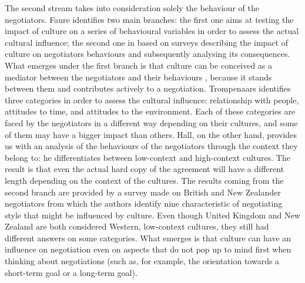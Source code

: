 \documentclass[../main.tex]{subfiles}
\begin{document}
The second stream takes into consideration solely the behaviour of the negotiators. Faure identifies two main branches: the first one aims at testing the impact of culture on a series of behavioural variables in order to assess the actual cultural influence; the second one in based on surveys describing the impact of culture on negotiators behaviours and subsequently analysing its consequences.
What emerges under the first branch is that culture can be conceived as a mediator between the negotiators and their behaviours \mancite\autocite[321]{carnevale}, because it stands between them and contributes actively to a negotiation. Trompenaars identifies three categories in order to assess the cultural influence: relationship with people, attitudes to time, and attitudes to the environment. Each of these categories are faced by the negotiators in a different way depending on their cultures, and some of them may have a bigger impact than others. Hall, on the other hand, provides us with an analysis of the behaviours of the negotiators through the context they belong to: he differentiates between low-context and high-context cultures. The result is that even the actual hard copy of the agreement will have a different length depending on the context of the cultures.
The results coming from the second branch are provided by a survey made on British and New Zealander negotiators from which the authors identify nine characteristic of negotiating style that might be influenced by culture. Even though United Kingdom and New Zealand are both considered Western, low-context cultures, they still had different answers on some categories. What emerges is that culture can have an influence on negotiation even on aspects that do not pop up to mind first when thinking about negotiations (such as, for example, the orientation towards a short-term goal or a long-term goal).
\end{document}
